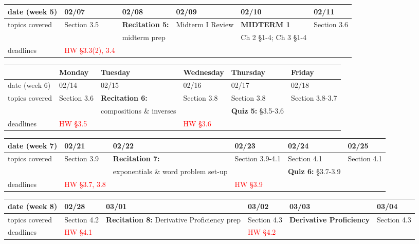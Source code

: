 \documentclass[11pt,fleqn]{article}
\begin{document}
\vfill
\begin{tabularx}{\textwidth}{|X|| X | X | X | X | X |}
\hline
\rowcolor{gray!20}
date (week 5)&02/07&02/08&02/09&02/10&02/11\\ \hline
topics covered&Section 3.5&\textbf{Recitation 5:} &Midterm I Review&\textcolor{dcyan}{\textbf{MIDTERM 1}}&Section 3.6\\
&&midterm prep&&Ch 2 \S 1-4; Ch 3 \S 1-4&\\ \hline
deadlines&\textcolor{red}{HW \S 3.3(2), 3.4}&&&& \\  \hline \hline
\end{tabularx}
\vfill
\newpage

\begin{tabularx}{\textwidth}{|X|| X | X | X | X | X |}
\hline
&Monday & Tuesday & Wednesday & Thursday & Friday \\
\hline \hline
\rowcolor{gray!20}
date (week 6)&02/14&02/15&02/16&02/17&02/18\\ \hline
topics covered&Section 3.6&\textbf{Recitation 6:}&Section 3.8&Section 3.8&Section 3.8-3.7\\ 
&&compositions \& inverses&&\textbf{Quiz 5:} \S 3.5-3.6&\\ \hline
deadlines&\textcolor{red}{HW \S3.5}&&\textcolor{red}{HW \S 3.6}&& \\ \hline
\end{tabularx}
\vfill
\begin{tabularx}{\textwidth}{|X|| X | X | X | X | X |}
\hline
\rowcolor{gray!20}
date (week 7)&02/21&02/22&02/23&02/24&02/25\\ \hline
topics covered&Section 3.9&\textbf{Recitation 7:}&Section 3.9-4.1&Section 4.1&Section 4.1\\ 
&&exponentials \& word problem set-up&&\textbf{Quiz 6:} \S 3.7-3.9&\\ \hline
deadlines&\textcolor{red}{HW \S 3.7, 3.8}& &\textcolor{red}{HW \S 3.9}&& \\\hline 
\end{tabularx}
\vfill
\begin{tabularx}{\textwidth}{|X|| X | X | X | X | X |}
\hline
\rowcolor{gray!20}
date (week 8)&02/28&03/01&03/02&03/03&03/04\\ \hline
topics covered&Section 4.2&\textbf{Recitation 8:} Derivative Proficiency prep&Section 4.3&\textcolor{dcyan}{\textbf{Derivative Proficiency}}&Section 4.3\\ 
 \hline
deadlines&\textcolor{red}{HW \S 4.1}&&\textcolor{red}{HW \S 4.2}&& \\ \hline 
\end{tabularx}
\end{document}

